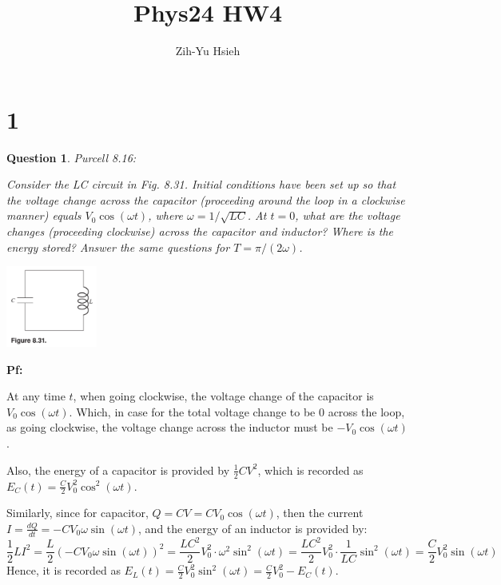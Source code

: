 \documentclass{article}
\title{Phys24 HW4}
\author{Zih-Yu Hsieh}
\newtheorem{question}{Question}
\begin{document}
\maketitle

\section*{1}
\begin{myBox}[]{}
    \begin{question}
        Purcell 8.16:

        Consider the LC circuit in Fig. 8.31. Initial conditions have been
        set up so that the voltage change across the capacitor (proceeding
        around the loop in a clockwise manner) equals $V_0\cos(\omega t)$, where
        $\omega = 1/\sqrt{LC}$. At $t = 0$, what are the voltage changes (proceeding
        clockwise) across the capacitor and inductor? Where is the energy
        stored? Answer the same questions for $T=\pi/(2\omega)$.

        \begin{center}
            \includegraphics*[width=30mm]{8.16.png}
        \end{center}
    \end{question}
\end{myBox}

\textbf{Pf:}

At any time $t$, when going clockwise, the voltage change of the capacitor is $V_0\cos(\omega t)$. Which, in case for the total voltage change to be $0$ across the loop,
as going clockwise, the voltage change across the inductor must be $-V_0\cos(\omega t)$.

Also, the energy of a capacitor is provided by $\frac{1}{2}CV^2$, which is recorded as $E_C(t) = \frac{C}{2}V_0^2\cos^2(\omega t)$.

Similarly, since for capacitor, $Q=CV = CV_0\cos(\omega t)$, then the current $I=\frac{dQ}{dt}=-CV_0\omega\sin(\omega t)$, and the energy of an inductor is provided by: 
$$\frac{1}{2}LI^2 = \frac{L}{2}\left(-CV_0\omega\sin(\omega t)\right)^2 = \frac{LC^2}{2}V_0^2\cdot \omega^2\sin^2(\omega t) = \frac{LC^2}{2}V_0^2\cdot\frac{1}{LC}\sin^2(\omega t)=\frac{C}{2}V_0^2\sin(\omega t)$$
Hence, it is recorded as $E_L(t)=\frac{C}{2}V_0^2\sin^2(\omega t)=\frac{C}{2}V_0^2 - E_C(t)$.
\end{document}
